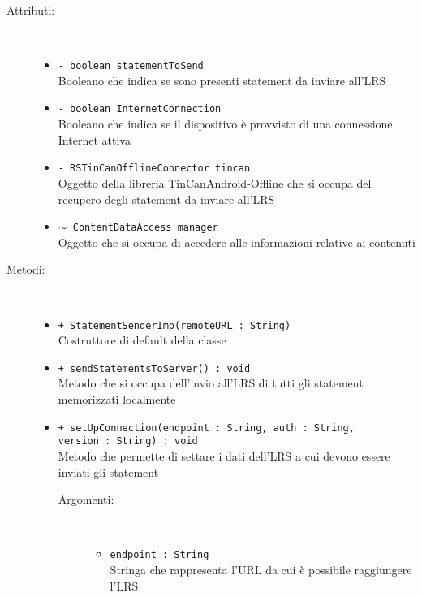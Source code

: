 \documentclass[../Tesi.tex]{subfiles}
\begin{document}
		\begin{description}
			\item[Attributi:] \
			\begin{itemize}
				\item \texttt{- boolean statementToSend}\\
				Booleano che indica se sono presenti statement da inviare all'LRS

				\item \texttt{- boolean InternetConnection}\\
				Booleano che indica se il dispositivo è provvisto di una connessione Internet attiva

				\item \texttt{- RSTinCanOfflineConnector tincan}\\
				Oggetto della libreria TinCanAndroid-Offline che si occupa del recupero degli statement da inviare all'LRS

				\item \texttt{$\sim$ ContentDataAccess manager}\\
				Oggetto che si occupa di accedere alle informazioni relative ai contenuti

			\end{itemize}

			\item[Metodi:] \
			\begin{itemize}
				\item \texttt{+ StatementSenderImp(remoteURL : String)}\\
				Costruttore di default della classe 
				
				\item \texttt{+ sendStatementsToServer() : void}\\
				Metodo che si occupa dell'invio all'LRS di tutti gli statement memorizzati localmente

				\item \texttt{+ setUpConnection(endpoint : String, auth : String, \\version : String) : void}\\
				Metodo che permette di settare i dati dell'LRS a cui devono essere inviati gli statement
				\begin{description}
					\item[Argomenti:] \
					\begin{itemize}
						\item \texttt{endpoint : String}\\
						Stringa che rappresenta l'URL da cui è possibile raggiungere l'LRS


\end{itemize}
\end{description}
\end{itemize}
\end{description}
\end{document}
